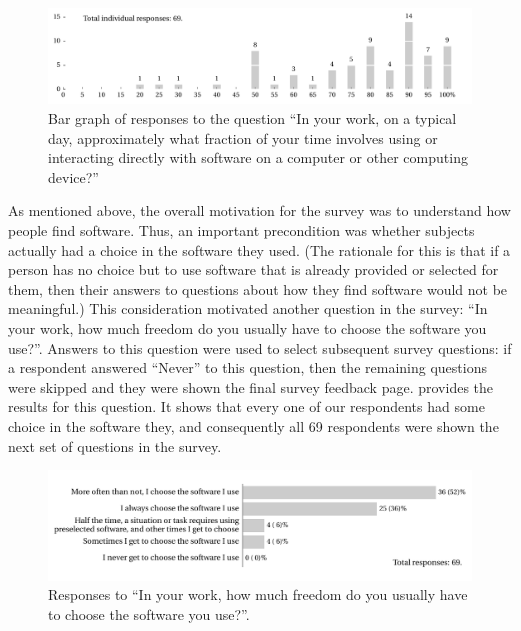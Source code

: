 \documentclass{casicswhitepaper}
\newcommand{\totalrespondents}{69\xspace}
\begin{document}
\begin{figure}[bht]
  \centering
  \includegraphics[trim=0.1in 0.1in 0 0,width=6.25in]{files/plots/bar-graph-time-spent-with-software.pdf}
  \caption{Bar graph of responses to the question ``In your work, on a
    typical day, approximately what fraction of your time involves using or
    interacting directly with software on a computer or other computing
    device?''}
  \label{time-with-software}
\end{figure}

As mentioned above, the overall motivation for the survey was to understand how people find software.  Thus, an important precondition was whether subjects actually had a choice in the software they used.  (The rationale for this is that if a person has no choice but to use software that is already provided or selected for them, then their answers to questions about how they find software would not be meaningful.)  This consideration motivated another question in the survey: ``In your work, how much freedom do you usually have to choose the software you use?''.   Answers to this question were used to select subsequent survey questions: if a respondent answered ``Never'' to this question, then the remaining questions were skipped and they were shown the final survey feedback page.   provides the results for this question.  It shows that every one of our respondents had some choice in the software they, and consequently all \totalrespondents respondents were shown the next set of questions in the survey.  %

\begin{figure}[htb]
  \vspace*{-1ex}
  \centering
  \includegraphics[width=6in]{files/plots/how-often-choose-software.pdf}
  \vspace*{-4ex}
  \caption{Responses to ``In your work, how much freedom do you usually have to choose the software you use?''.}
  \label{freedom}
\end{figure}
\end{document}
